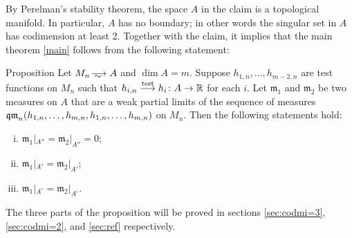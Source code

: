 By Perelman's stability theorem, the space $A$ in the claim is a topological manifold.
In particular, $A$ has no boundary;
in other words the singular set in $A$ has codimension at least 2.
Together with the claim, it implies that the main theorem \ref{main} follows from the following statement:

\begin{thm}{Proposition}\label{prop:3parts}
Let $M_n\smooths{} A$ and $\dim A=m$.
Suppose $h_{1,n},\dots, h_{m-2,n}$ are test functions on $M_n$ 
such that $h_{i,n}\zz\testto  h_i\:A\to \RR$ for each $i$.
Let $\mathfrak m_1$ and $\mathfrak m_2$ be two measures on $A$ that are a weak partial limits of the sequence of measures $\qm_n( h_{1,n},\zz\dots,  h_{m,n}, h_{1,n},\zz\dots,  h_{m,n})$ on $M_n$.
Then the following statements hold:
\begin{enumerate}[(i)]
\item\label{prop:3parts:codim3} $\mathfrak m_1|_{A''}=\mathfrak m_2|_{A''}=0$;

\item\label{prop:3parts:codim2} $\mathfrak m_1|_{A'}=\mathfrak m_2|_{A'}$;

\item\label{prop:3parts:reg} $\mathfrak m_1|_{A^\circ}=\mathfrak m_2|_{A^\circ}$.
\end{enumerate}
\end{thm}

The three parts of the proposition will be proved in sections \ref{sec:codmi=3}, \ref{sec:codmi=2}, and \ref{sec:ref} respectively.
